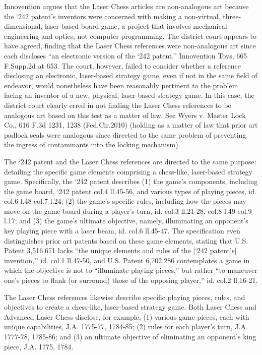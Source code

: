 Innovention argues that the Laser Chess articles are non-analogous art because
the `242 patent's inventors were concerned with making a non-virtual,
three-dimensional, laser-based board game, a project that involves mechanical
engineering and optics, not computer programming. The district court appears to
have agreed, finding that the Laser Chess references were non-analogous art
since each discloses ``an electronic version of the `242 patent.'' Innovention
Toys, 665 F.Supp.2d at 653. The court, however, failed to consider whether a
reference disclosing an electronic, laser-based strategy game, even if not in
the same field of endeavor, would nonetheless have been reasonably pertinent to
the problem facing an inventor of a new, physical, laser-based strategy game.
In this case, the district court clearly erred in not finding the Laser Chess
references to be analogous art based on this test as a matter of law. See Wyers
v. Master Lock Co., 616 F.3d 1231, 1238 (Fed.Cir.2010) (holding as a matter of
law that prior art padlock seals were analogous since directed to the same
problem of preventing the ingress of contaminants into the locking mechanism).

The `242 patent and the Laser Chess references are directed to the same purpose:
detailing the specific game elements comprising a chess-like, laser-based
strategy game. Specifically, the `242 patent describes (1) the game's
components, including the game board, `242 patent col.4 ll.45-56, and various
types of playing pieces, id. col.6 l.48-col.7 l.24; (2) the game's specific
rules, including how the pieces may move on the game board during a player's
turn, id. col.3 ll.21-28, col.8 l.49-col.9 l.17; and (3) the game's ultimate
objective, namely, illuminating an opponent's key playing piece with a laser
beam, id. col.6 ll.45-47. The specification even distinguishes prior art
patents based on these game elements, stating that U.S. Patent 3,516,671 lacks
``the unique elements and rules of the [`242 patent's] invention,'' id. col.1
ll.47-50, and U.S. Patent 6,702,286 contemplates a game in which the objective
is not to ``illuminate playing pieces,'' but rather ``to maneuver one's pieces
to flank (or surround) those of the opposing player,'' id. col.2 ll.16-21.

The Laser Chess references likewise describe specific playing pieces, rules, and
objectives to create a chess-like, laser-based strategy game. Both Laser Chess
and Advanced Laser Chess disclose, for example, (1) various game pieces, each
with unique capabilities, J.A. 1775-77, 1784-85; (2) rules for each player's
turn, J.A. 1777-78, 1785-86; and (3) an ultimate objective of eliminating an
opponent's king piece, J.A. 1775, 1784.

